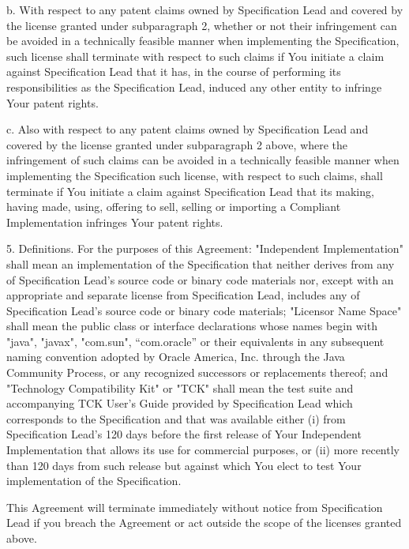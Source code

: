 \begin{flushleft}
 \hspace{1em} b. With respect to any patent claims owned by Specification Lead and 
covered by the license granted under subparagraph 2, whether or not their infringement 
can be avoided in a technically feasible manner when implementing the Specification, 
such license shall terminate with respect to such claims if You initiate a claim against 
Specification Lead that it has, in the course of performing its responsibilities 
as the Specification Lead, induced any other entity to infringe Your patent rights.

 \hspace{1em} c. Also with respect to any patent claims owned by Specification Lead 
and covered by the license granted under subparagraph 2 above, where the infringement 
of such claims can be avoided in a technically feasible manner when implementing the 
Specification such license, with respect to such claims, shall terminate if You 
initiate a claim against Specification Lead that its making, having made, using, 
offering to sell, selling or importing a Compliant Implementation infringes Your patent 
rights.

5. Definitions. For the purposes of this Agreement:  
"Independent Implementation" shall mean an implementation of the Specification that 
neither derives from any of Specification Lead's source code or binary code materials nor, 
except with an appropriate and separate license from Specification Lead, includes 
any of Specification Lead's source code or binary code materials; 
"Licensor Name Space" shall mean the public class or interface declarations whose 
names begin with "java", "javax", "com.sun", “com.oracle” or their equivalents in any 
subsequent naming convention adopted by Oracle America, Inc. through the Java Community 
Process, or any recognized successors or replacements thereof; and 
"Technology Compatibility Kit" or "TCK" shall mean the test suite and accompanying 
TCK User's Guide provided by Specification Lead which corresponds to the Specification 
and that was available either 
(i) from Specification Lead's 120 days before the first release of Your Independent 
Implementation that allows its use for commercial purposes, or 
(ii) more recently than 120 days from such release but against which You elect to 
test Your implementation of the Specification.

This Agreement will terminate immediately without notice from Specification Lead if you breach the Agreement or act outside the scope of the licenses granted above.


\end{flushleft}
